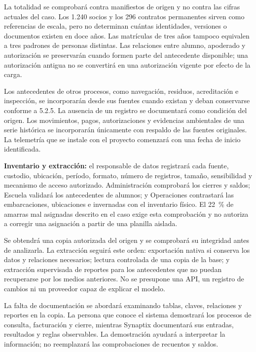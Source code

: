 La totalidad se comprobará contra manifiestos de origen y no contra las cifras actuales del caso. Los 1.240 socios y los 296 contratos permanentes sirven como referencias de escala, pero no determinan cuántas identidades, versiones o documentos existen en doce años. Las matrículas de tres años tampoco equivalen a tres padrones de personas distintas. Las relaciones entre alumno, apoderado y autorización se preservarán cuando formen parte del antecedente disponible; una autorización antigua no se convertirá en una autorización vigente por efecto de la carga.

Los antecedentes de otros procesos, como navegación, residuos, acreditación e inspección, se incorporarán desde sus fuentes cuando existan y deban conservarse conforme a 5.2.5. La ausencia de un registro se documentará como condición del origen. Los movimientos, pagos, autorizaciones y evidencias ambientales de una serie histórica se incorporarán únicamente con respaldo de las fuentes originales. La telemetría que se instale con el proyecto comenzará con una fecha de inicio identificada.

\textbf{Inventario y extracción:} el responsable de datos registrará cada fuente, custodio, ubicación, período, formato, número de registros, tamaño, sensibilidad y mecanismo de acceso autorizado. Administración comprobará los cierres y saldos; Escuela validará los antecedentes de alumnos; y Operaciones contrastará las embarcaciones, ubicaciones e invernadas con el inventario físico. El 22~\% de amarras mal asignadas descrito en el caso exige esta comprobación y no autoriza a corregir una asignación a partir de una planilla aislada.

Se obtendrá una copia autorizada del origen y se comprobará su integridad antes de analizarla. La extracción seguirá este orden: exportación nativa si conserva los datos y relaciones necesarios; lectura controlada de una copia de la base; y extracción supervisada de reportes para los antecedentes que no puedan recuperarse por los medios anteriores. No se presupone una API, un registro de cambios ni un proveedor capaz de explicar el modelo.

La falta de documentación se abordará examinando tablas, claves, relaciones y reportes en la copia. La persona que conoce el sistema demostrará los procesos de consulta, facturación y cierre, mientras Synaptix documentará sus entradas, resultados y reglas observables. La demostración ayudará a interpretar la información; no reemplazará las comprobaciones de recuentos y saldos.

